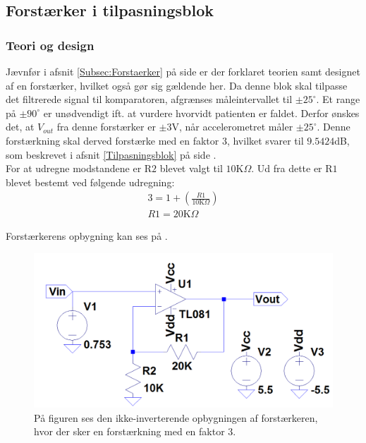 \subsection{Forstærker i tilpasningsblok}
\subsubsection{Teori og design}
Jævnfør i afsnit \ref{Subsec:Forstaerker} på side \pageref{Subsec:Forstaerker} er der forklaret teorien samt designet af en forstærker, hvilket også gør sig gældende her. Da denne blok skal tilpasse det filtrerede signal til komparatoren, afgrænses måleintervallet til $\pm25^{\circ}$. Et range på $\pm90^{\circ}$ er unødvendigt ift. at vurdere hvorvidt patienten er faldet. Derfor ønskes det, at $V_{out}$ fra denne forstærker er $\pm3$V, når accelerometret måler $\pm25^{\circ}$. Denne forstærkning skal derved forstærke med en faktor 3, hvilket svarer til $9.5424$dB, som beskrevet i afsnit \ref{Tilpasningsblok} på side \pageref{Tilpasningsblok}. \\
For at udregne modstandene er R$2$ blevet valgt til $10$K$\Omega$. Ud fra dette er R$1$ blevet bestemt ved følgende udregning:
\begin{align}
3 = 1 + (\frac{R1}{10\text{K}\Omega})\\
R1 = 20\text{K}\Omega
\end{align}

\noindent Forstærkerens opbygning kan ses på .
\begin{figure}[H]
	\centering
	\includegraphics[scale=0.4]{figures/cProblemloesning/Forstaerker_faktor3.PNG}
	\caption{På figuren ses den ikke-inverterende opbygningen af forstærkeren, hvor der sker en forstærkning med en faktor $3$.}
	\label{fig:Forstaerker_faktor3}
\end{figure}

